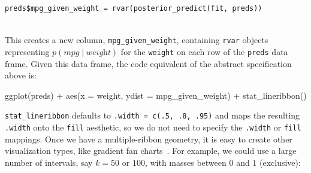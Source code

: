 \documentclass[journal]{vgtc}                     %
\newenvironment{centerverbatim}{%
\setlength{\parskip}{.4\belowdisplayskip}%
\vspace{.55\abovedisplayskip}%
\noindent%
\small%
\centering%
\varwidth{\linewidth}%
\verbatim
}{%
\endverbatim%
\endvarwidth%
\par%
\hfill\break%
}
\begin{document}
\begin{minipage}{\columnwidth}
\vspace{\abovedisplayskip}
\small
\centering
\begin{verbatim}
preds$mpg_given_weight = rvar(posterior_predict(fit, preds))
\end{verbatim}
\end{minipage}\vspace{\belowdisplayskip}\\
This creates a new column, \texttt{mpg\_given\_weight}, containing \texttt{rvar} objects representing $p(\textit{mpg} \mid \textit{weight})$ for the \texttt{weight} on each row of the \texttt{preds} data frame. Given this data frame, the code equivalent of the abstract specification above is:

\begin{centerverbatim}
ggplot(preds) +
  aes(x = weight, ydist = mpg_given_weight) +
  stat_lineribbon()
\end{centerverbatim}
\texttt{stat\_lineribbon} defaults to \texttt{.width = c(.5, .8, .95)} and maps the resulting \texttt{.width} onto the \texttt{fill} aesthetic, so we do not need to specify the \texttt{.width} or \texttt{fill} mappings. Once we have a multiple-ribbon geometry, it is easy to create other visualization types, like gradient fan charts~\cite{bowman2019graphics,jackson2008displaying}. For example, we could use a large number of intervals, say $k = 50$ or $100$, with masses between 0 and 1 (exclusive):
\end{document}
